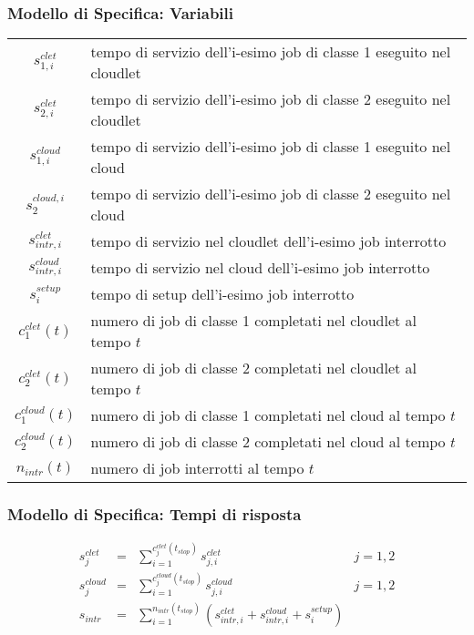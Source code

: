\begin{frame}
\frametitle{Modello di Specifica: Variabili}
\begin{table}[!h]
\begin{adjustbox}{width=\textwidth}
\begin{tabular}{c|l}
{$s_{1,i}^{clet}$}     & tempo di servizio dell’i-esimo job di classe 1 eseguito
nel cloudlet \\[2pt]
{$s_{2,i}^{clet}$}     & tempo di servizio dell’i-esimo job di classe 2 eseguito
nel cloudlet \\[2pt]
{$s_{1,i}^{cloud}$}    & tempo di servizio dell’i-esimo job di classe 1 eseguito
nel cloud \\[2pt]
{$s_2^{cloud,i}$}      & tempo di servizio dell’i-esimo job di classe 2 eseguito
nel cloud \\[2pt]
{$s_{intr,i}^{clet}$}  & tempo di servizio nel cloudlet dell’i-esimo job
interrotto \\[2pt]
{$s_{intr,i}^{cloud}$} & tempo di servizio nel cloud dell’i-esimo job interrotto
\\[2pt]
{$s_i^{setup}$}        & tempo di setup dell’i-esimo job interrotto \\[2pt]
{$c_1^{clet}(t)$}      & numero di job di classe 1 completati nel cloudlet al
tempo $t$ \\[2pt]
{$c_2^{clet}(t)$}      & numero di job di classe 2 completati nel cloudlet al
tempo $t$ \\[2pt] 
{$c_1^{cloud}(t)$}     & numero di job di classe 1 completati nel cloud al tempo
$t$ \\[2pt] 
{$c_2^{cloud}(t)$}     & numero di job di classe 2 completati nel cloud al tempo
$t$ \\[2pt]
{$n_{intr}(t)$}        & numero di job interrotti al tempo $t$ \\
\end{tabular}
\end{adjustbox}
\centering
\label{vars}
\end{table}
%
\end{frame}
\begin{frame}
\frametitle{Modello di Specifica: Tempi di risposta}
\setlength\arraycolsep{2pt}
\begin{displaymath}
\begin{array}{rclr}
s_j^{clet} &=& 
\displaystyle \sum_{i=1}^{c_j^{clet}(t_{stop})} s_{j,i}^{clet} 
& j = 1, 2 \\[30pt]
s_j^{cloud} &=& \displaystyle \sum_{i=1}^{c_j^{cloud}(t_{stop})} s_{j,i}^{cloud}
& j = 1, 2 \\[30pt]
s_{intr} &=& \sum_{i=1}^{n_{intr}(t_{stop})} (s_{intr,i}^{clet} +
s_{intr,i}^{cloud} + s_i^{setup}) &
\end{array}
\end{displaymath}
\end{frame}
